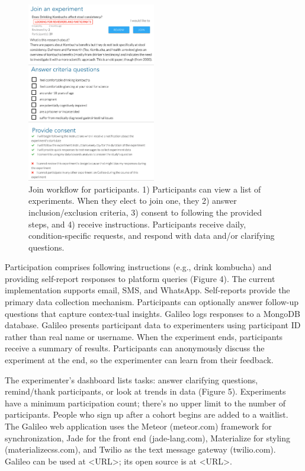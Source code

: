 \begin{figure}
  \centering
  \includegraphics[width=0.5\textwidth]{figures/galileo/galileo-2-run}
  \caption[Join workflow for participants]
{Join workflow for participants. 1) Participants can view a list of experiments. When they elect to join one, they 2) answer inclusion/exclusion criteria, 3) consent to following the provided steps, and 4) receive instructions. Participants receive daily, condition-specific requests, and respond with data and/or clarifying questions. }
  \label{fig:galileo-2-run}
\end{figure}

Participation comprises following instructions (e.g., drink kombucha) and providing self-report responses to platform queries (Figure 4). The current implementation supports email, SMS, and WhatsApp. Self-reports provide the primary data collection mechanism. Participants can optionally answer follow-up questions that capture contex-tual insights. Galileo logs responses to a MongoDB database. Galileo presents participant data to experimenters using participant ID rather than real name or username. When the experiment ends, participants receive a summary of results. Participants can anonymously discuss the experiment at the end, so the experimenter can learn from their feedback. 

The experimenter’s dashboard lists tasks: answer clarifying questions, remind/thank participants, or look at trends in data (Figure 5). Experiments have a minimum participation count; there’s no upper limit to the number of participants. People who sign up after a cohort begins are added to a waitlist.
The Galileo web application uses the Meteor (meteor.com) framework for synchronization, Jade for the front end (jade-lang.com), Materialize for styling (materializecss.com), and Twilio as the text message gateway (twilio.com). Galileo can be used at <URL>; its open source is at <URL>. 


